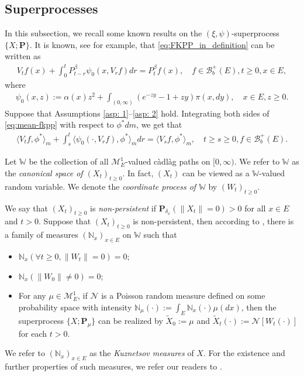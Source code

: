 \subsection{Superprocesses} \label{sec: Superprocesses}
	In this subsection, we recall some known results on the $(\xi, \psi)$-superprocess $\{X; \mathbf P\}$.
	It is known, see \cite[Theorem 2.23]{Li2011Measure-valued} for example, that \eqref{eq:FKPP_in_definition} can be written as
\begin{align}\label{eq:mean-fkpp}
	V_t f(x) + \int_0^t P^\beta_{t-r} \psi_0(x,V_r f) dr
	= P^\beta_t f(x),
	\quad f \in \mathscr B^+_b(E), t \geq 0,x \in E,
\end{align}
	where
\begin{align}
	\psi_0(x,z)
	:= \alpha(x) z^2 + \int_{(0,\infty)} (e^{-z y} - 1 + z y) \pi(x,dy),
	\quad x \in E,z \geq 0.
\end{align}
    Suppose that Assumptions \ref{asp: 1}--\ref{asp: 2} hold.
    Integrating both sides of \eqref{eq:mean-fkpp}  with respect to  $\phi^*dm$, we get that
\begin{align}\label{eq:langleVtfphiranglem_equation}
	\langle V_tf,\phi^*\rangle_m + \int_s^t \langle \psi_0(\cdot ,V_r f) , \phi^*\rangle_mdr
	= \langle V_sf,\phi^*\rangle_m,
	\quad t\geq s\geq 0, f\in \mathscr B^+_b(E).
\end{align}

	Let $\mathbb W$ be the collection of all $\mathcal M^1_E$-valued c\`{a}dl\`{a}g paths on $[0,\infty)$.
	We refer to $\mathbb W$ as the \emph{canonical space of $(X_t)_{t\geq 0}$}.
	In fact, $(X_t)$ can be viewed as a $\mathbb W$-valued random variable.
	We denote the \emph{coordinate process of $\mathbb W$} by $(W_t)_{t\geq 0}$.

	We say that $(X_t)_{t\geq 0}$ is \emph{non-persistent} if $\mathbf P_{\delta_x}(\|X_t\|= 0) > 0$ for all $x\in E$ and $t> 0$.
	Suppose that $(X_t)_{t\geq 0}$ is non-persistent,
	then according to \cite[Section 8.4]{Li2011Measure-valued},
	there is a family of measures $(\mathbb N_x)_{x\in E}$ on $\mathbb W$ such that
\begin{itemize}
\item
	$\mathbb N_x (\forall t \geq 0, \|W_t\|=0) =0$;
\item
	$\mathbb N_x(\|W_0 \|\neq 0) = 0$;
\item
	For any $\mu \in \mathcal M_E^1$, if $\mathcal N$ is a Poisson random measure defined on some probability space
	with intensity $\mathbb N_\mu(\cdot):= \int_E \mathbb N_x(\cdot )\mu(dx)$,
	then the superprocess $\{X;\mathbf P_\mu\}$ can be realized by $\widetilde X_0 := \mu$ and $\widetilde X_t(\cdot) := \mathcal N[W_t(\cdot)]$ for each $t>0$.
\end{itemize}
	We refer to $(\mathbb N_x)_{x\in E}$ as the \emph{Kuznetsov measures} of $X$.
	For the existence and further properties of such measures, we refer our readers to \cite{Li2011Measure-valued}.

